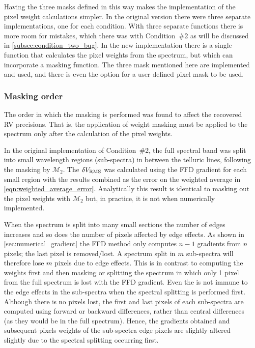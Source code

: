 Having the three masks defined in this way makes the implementation of the pixel weight calculations simpler.
In the original version there were three separate implementations, one for each condition.
With three separate functions there is more room for mistakes, which there was with Condition~\#2 as will be discussed in \cref{subsec:condition_two_bug}.
In the new implementation there is a single function that calculates the pixel weights from the spectrum, but which can incorporate a masking function.
The three mask mentioned here are implemented and used, and there is even the option for a user defined pixel mask to be used.


\subsubsection{Masking order}
\label{subsubsec:masking_order}
The order in which the masking is performed was found to affect the recovered RV precisions.
That is, the application of weight masking must be applied to the spectrum only after the calculation of the pixel weights.

In the original implementation of Condition~\#2, the full spectral band was split into small wavelength regions (sub-spectra) in between the telluric lines, following the masking by \(\mathcal{M}_{2}\).
The \(\delta V_{\textrm{RMS}}\) was calculated using the {FFD} gradient for each small region with the results combined as the error on the weighted average in \cref{eqn:weighted_average_error}.
Analytically this result is identical to masking out the pixel weights with \({\mathcal{M}}_{2}\) but, in practice, it is not when numerically implemented.

When the spectrum is split into many small sections the number of edges increases and so does the number of pixels affected by edge effects.
As shown in \cref{sec:numerical_gradient} the {FFD} method only computes \(n-1\) gradients from \(n\) pixels; the last pixel is removed/lost.
A spectrum split in \(m\) sub-spectra will therefore lose \(m\) pixels due to edge effects.
This is in contrast to computing the weights first and then masking or splitting the spectrum in which only 1 pixel from the full spectrum is lost with the {FFD} gradient.
Even the \npgradient{} is not immune to the edge effects in the sub-spectra when the spectral splitting is performed first.
Although there is no pixels lost, the first and last pixels of each sub-spectra are computed using forward or backward differences, rather than central differences (as they would be in the full spectrum).
Hence, the gradients obtained and subsequent pixels weights of the sub-spectra edge pixels are slightly altered slightly due to the spectral splitting occurring first.

